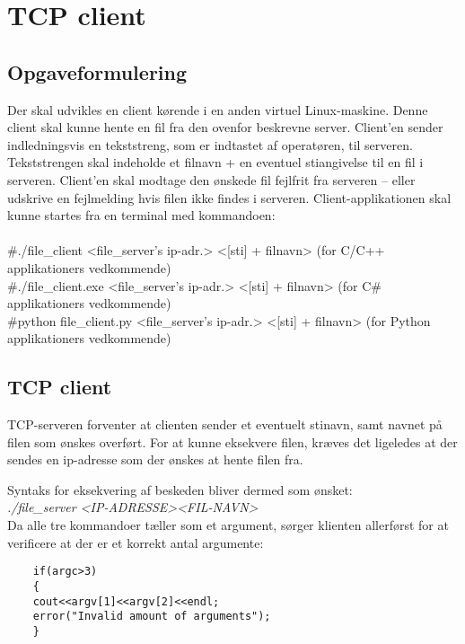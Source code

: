 \chapter{TCP client}

\section{Opgaveformulering}

Der skal udvikles en client kørende i en anden virtuel Linux-maskine. Denne client
skal kunne hente en fil fra den ovenfor beskrevne server. Client’en sender
indledningsvis en tekststreng, som er indtastet af operatøren, til serveren.
Tekststrengen skal indeholde et filnavn + en eventuel stiangivelse til en fil i serveren.
Client’en skal modtage den ønskede fil fejlfrit fra serveren – eller udskrive en
fejlmelding hvis filen ikke findes i serveren. Client-applikationen skal kunne startes fra
en terminal med kommandoen:\\ \\
\#./file\_client <file\_server’s ip-adr.> <[sti] + filnavn> (for C/C++ applikationers
vedkommende)\\
\#./file\_client.exe <file\_server’s ip-adr.> <[sti] + filnavn> (for C\# applikationers
vedkommende)\\ 
\#python file\_client.py <file\_server’s ip-adr.> <[sti] + filnavn> (for Python applikationers
vedkommende)\\

\section{TCP client}

TCP-serveren forventer at clienten sender et eventuelt stinavn, samt navnet på filen som ønskes overført. 
For at kunne eksekvere filen, kræves det ligeledes at der sendes en ip-adresse som der ønskes at hente filen fra. 

Syntaks for eksekvering af beskeden bliver dermed som ønsket:\\
\textit{./file\_server <IP-ADRESSE><FIL-NAVN>} \\

Da alle tre kommandoer tæller som et argument, sørger klienten allerførst for at verificere at der er et korrekt antal argumente:

\begin{lstlisting}
	if(argc>3)
	{
	cout<<argv[1]<<argv[2]<<endl;
	error("Invalid amount of arguments");
	}
\end{lstlisting}


